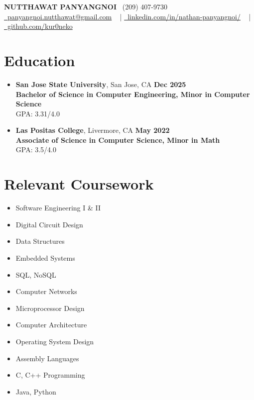 \documentclass[letterpaper,11pt]{article}
\begin{document}
\vspace{-10pt}
\begin{center}
    {\Large \textbf{NUTTHAWAT PANYANGNOI}} \vspace{1pt} 
    \small 
    \raisebox{-0.1\height}\faPhone\ (209) 407-9730 \\
    \href{mailto:panyangnoi.nutthawat@gmail.com}{\raisebox{-0.2\height}\faEnvelope\ panyangnoi.nutthawat@gmail.com} ~ |
    \href{https://www.linkedin.com/in/nathan-panyangnoi/}{\raisebox{-0.2\height}\faLinkedin\ linkedin.com/in/nathan-panyangnoi/} ~ |
    \href{https://github.com/kur0neko}{\raisebox{-0.2\height}\faGithub\ github.com/kur0neko} 
    \vspace{-8pt}
\end{center}

\section{Education}
\begin{itemize}[leftmargin=0.15in, label={}]
    \item \textbf{San Jose State University}, San Jose, CA \hfill \textbf{Dec 2025} \\ 
    \textbf{Bachelor of Science in Computer Engineering, Minor in Computer Science} \\ 
    GPA: 3.31/4.0
    \item \textbf{Las Positas College}, Livermore, CA \hfill \textbf{May 2022}  \\
    \textbf{Associate of Science in Computer Science, Minor in Math} \\ 
    GPA: 3.5/4.0
\end{itemize}

\section{Relevant Coursework}
\begin{multicols}{3}
    \begin{itemize}[itemsep=1pt, parsep=2pt]
        \item Software Engineering I \& II
        \item Digital Circuit Design
        \item Data Structures
        \item Embedded Systems
        \item SQL, NoSQL
        \item Computer Networks
        \item Microprocessor Design
        \item Computer Architecture
        \item Operating System Design
        \item Assembly Languages
        \item C, C++ Programming
        \item Java, Python
    \end{itemize}
\end{multicols}
\end{document}
